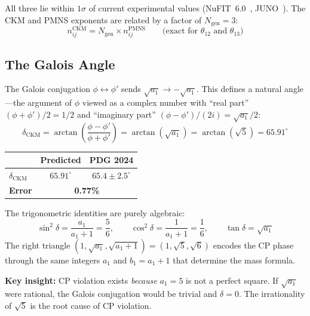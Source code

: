 \documentclass[12pt,a4paper]{article}
\theoremstyle{definition}
\begin{document}
All three lie within $1\sigma$ of current experimental values (NuFIT~6.0~\cite{nufit6}, JUNO~\cite{juno2025}). The CKM and PMNS exponents are related by a factor of $N_{\text{gen}} = 3$:
\begin{equation}
n^{\text{CKM}}_{ij} = N_{\text{gen}} \times n^{\text{PMNS}}_{ij} \qquad \text{(exact for } \theta_{12} \text{ and } \theta_{13}\text{)}
\end{equation}



\subsection{The Galois Angle}

The Galois conjugation $\phi \leftrightarrow \phi'$ sends $\sqrt{a_1} \to -\sqrt{a_1}$. This defines a natural angle---the argument of $\phi$ viewed as a complex number with ``real part'' $(\phi + \phi')/2 = 1/2$ and ``imaginary part'' $(\phi - \phi')/(2i) = \sqrt{a_1}/2$:
\begin{equation}
\boxed{\delta_{\text{CKM}} = \arctan\!\left(\frac{\phi - \phi'}{\phi + \phi'}\right) = \arctan(\sqrt{a_1}) = \arctan(\sqrt{5}) = 65.91^\circ}
\label{eq:cp_ckm}
\end{equation}

\begin{center}
\begin{tabular}{lcc}
\toprule
& \textbf{Predicted} & \textbf{PDG 2024} \\
\midrule
$\delta_{\text{CKM}}$ & $65.91^\circ$ & $65.4 \pm 2.5^\circ$ \\
\textbf{Error} & \multicolumn{2}{c}{\textbf{0.77\%}} \\
\bottomrule
\end{tabular}
\end{center}

The trigonometric identities are purely algebraic:
\begin{equation}
\sin^2\delta = \frac{a_1}{a_1+1} = \frac{5}{6}, \qquad \cos^2\delta = \frac{1}{a_1+1} = \frac{1}{6}, \qquad \tan\delta = \sqrt{a_1}
\end{equation}
The right triangle $(1, \sqrt{a_1}, \sqrt{a_1+1}) = (1, \sqrt{5}, \sqrt{6})$ encodes the CP phase through the same integers $a_1$ and $b_1 = a_1 + 1$ that determine the mass formula.

\textbf{Key insight:} CP violation exists \emph{because} $a_1 = 5$ is not a perfect square. If $\sqrt{a_1}$ were rational, the Galois conjugation would be trivial and $\delta = 0$. The irrationality of $\sqrt{5}$ is the root cause of CP violation.
\end{document}
